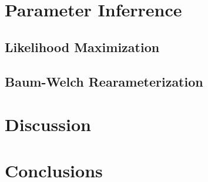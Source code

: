 \documentclass{article}
\begin{document}
\section{Parameter Inferrence}

\subsection{Likelihood Maximization}

\subsection{Baum-Welch Rearameterization}

\section{Discussion}

\section{Conclusions}

\appendix
\end{document}
